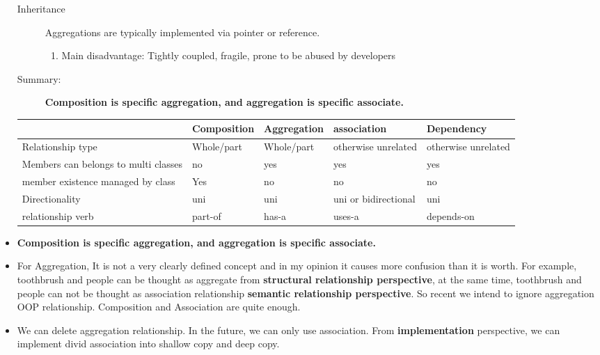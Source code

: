 \documentclass[a4paper,11pt,twoside]{book}
\newcommand{\tophline}{\hline }
\newcommand{\bottomhline}{\\ \hline }
\newcommand{\tophline}{ }
\newcommand{\bottomhline}{ }
\begin{document}
\begin{itemize}
\begin{description}
	\item [Inheritance ] Aggregations are typically implemented via pointer or reference.
\begin{enumerate}
	\item Main disadvantage: Tightly coupled, fragile, prone to be abused by developers
\end{enumerate}

	\item [Summary:] \textbf{Composition is specific aggregation, and aggregation is specific associate.}
	\end{description}

\begin{center}
	\begin{tabular}{|p{}|p{}|p{}|p{}|p{}|}
		\tophline 
		 & Composition  & Aggregation  & association & Dependency \\ 
		\tophline 
		Relationship type& Whole/part  & Whole/part  & otherwise unrelated  & otherwise unrelated  \\ 
		\tophline 
		Members can belongs to multi classes& no  & yes & yes & yes  \\ 
		\tophline 
		member existence managed by class& Yes & no & no   & no \\ 
		\tophline 
		Directionality & uni  & uni & uni or bidirectional & uni  \\ 
		\tophline 
		relationship verb& part-of & has-a & uses-a & depends-on 
		\bottomhline 
	\end{tabular}
\end{center}

	\item \textbf{Composition is specific aggregation, and aggregation is specific associate.}

	\item For Aggregation, It is not a very clearly defined concept and in my opinion it causes more confusion than it is worth. For example, toothbrush and people can be thought as aggregate from \textbf{structural relationship perspective}, at the same time, toothbrush and people can not be thought as association relationship \textbf{semantic relationship perspective}. So recent we intend to ignore aggregation OOP relationship. Composition and Association are quite enough.  
	
	\item We can delete aggregation relationship. In the future, we can only use association. From \textbf{implementation} perspective,  we can implement divid association into shallow copy and deep copy. 
	

\end{itemize}
\end{document}
